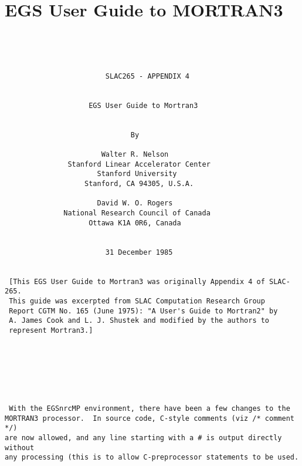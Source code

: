 \section{EGS User Guide to MORTRAN3}
\label{UGM3}
\begin{verbatim}
 
 

 
                        SLAC265 - APPENDIX 4
 
 
                    EGS User Guide to Mortran3
 

                              By

                       Walter R. Nelson
               Stanford Linear Accelerator Center
                      Stanford University
                   Stanford, CA 94305, U.S.A.

                      David W. O. Rogers
              National Research Council of Canada
                    Ottawa K1A 0R6, Canada

 
                        31 December 1985
 
 
 [This EGS User Guide to Mortran3 was originally Appendix 4 of SLAC-265.
 This guide was excerpted from SLAC Computation Research Group
 Report CGTM No. 165 (June 1975): "A User's Guide to Mortran2" by
 A. James Cook and L. J. Shustek and modified by the authors to 
 represent Mortran3.]







 With the EGSnrcMP environment, there have been a few changes to the
MORTRAN3 processor.  In source code, C-style comments (viz /* comment */)
are now allowed, and any line starting with a # is output directly without
any processing (this is to allow C-preprocessor statements to be used.
\end{verbatim} 

